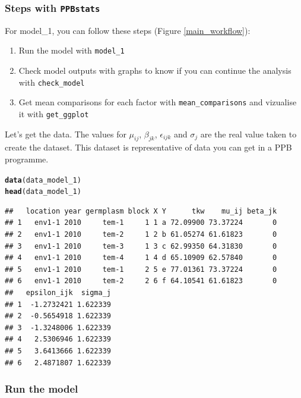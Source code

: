\documentclass{article}\usepackage[]{graphicx}\usepackage[]{color}
\makeatletter
\newcommand{\hlstd}[1]{\textcolor[rgb]{0.345,0.345,0.345}{#1}}%
\newcommand{\hlkwd}[1]{\textcolor[rgb]{0.737,0.353,0.396}{\textbf{#1}}}%
\newenvironment{kframe}{%
 \def\at@end@of@kframe{}%
 \ifinner\ifhmode%
  \def\at@end@of@kframe{\end{minipage}}%
  \begin{minipage}{\columnwidth}%
 \fi\fi%
 \def\FrameCommand##1{\hskip\@totalleftmargin \hskip-\fboxsep
 \colorbox{shadecolor}{##1}\hskip-\fboxsep
     \hskip-\linewidth \hskip-\@totalleftmargin \hskip\columnwidth}%
 \MakeFramed {\advance\hsize-\width
   \@totalleftmargin\z@ \linewidth\hsize
   \@setminipage}}%
 {\par\unskip\endMakeFramed%
 \at@end@of@kframe}
\newenvironment{knitrout}{}{} %
\newcommand{\pack}{\texttt{PPBstats}}
\makeatother
\begin{document}
\subsubsection{Steps with \pack}

For model\_1, you can follow these steps (Figure \ref{main_workflow}):

\begin{enumerate}
\item Run the model with \texttt{model\_1}
\item Check model outputs with graphs to know if you can continue the analysis with \texttt{check\_model}
\item Get mean comparisons for each factor with \texttt{mean\_comparisons} and vizualise it with \texttt{get\_ggplot}
\end{enumerate}

Let's get the data.
The values for $\mu_{ij}$, $\beta_{jk}$, $\epsilon_{ijk}$ and $\sigma_j$ are the real value taken to create the dataset.
This dataset is representative of data you can get in a PPB programme.

\begin{knitrout}
\color{fgcolor}\begin{kframe}
\begin{alltt}
\hlkwd{data}\hlstd{(data_model_1)}
\hlkwd{head}\hlstd{(data_model_1)}
\end{alltt}
\begin{verbatim}
##   location year germplasm block X Y      tkw    mu_ij beta_jk
## 1   env1-1 2010     tem-1     1 1 a 72.09900 73.37224       0
## 2   env1-1 2010     tem-2     1 2 b 61.05274 61.61823       0
## 3   env1-1 2010     tem-3     1 3 c 62.99350 64.31830       0
## 4   env1-1 2010     tem-4     1 4 d 65.10909 62.57840       0
## 5   env1-1 2010     tem-1     2 5 e 77.01361 73.37224       0
## 6   env1-1 2010     tem-2     2 6 f 64.10541 61.61823       0
##   epsilon_ijk  sigma_j
## 1  -1.2732421 1.622339
## 2  -0.5654918 1.622339
## 3  -1.3248006 1.622339
## 4   2.5306946 1.622339
## 5   3.6413666 1.622339
## 6   2.4871807 1.622339
\end{verbatim}
\end{kframe}
\end{knitrout}

\subsubsection{Run the model}
\end{document}
